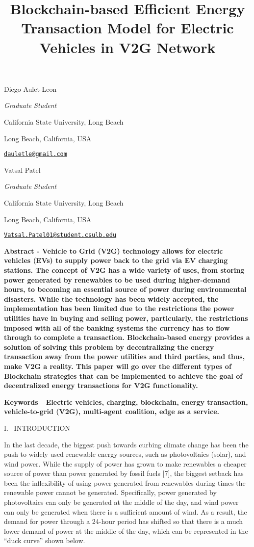 \documentclass[
]{article}
\title{\protect\hypertarget{_rock487eds43}{}{}Blockchain-based Efficient
Energy Transaction Model for Electric Vehicles in V2G Network}
\author{}
\date{}
\begin{document}
\maketitle

Diego Aulet-Leon

\emph{Graduate Student}

California State University, Long Beach

Long Beach, California, USA

\href{mailto:dauletle@gmail.com}{\nolinkurl{dauletle@gmail.com}}

Vatsal Patel

\emph{Graduate Student}

California State University, Long Beach

Long Beach, California, USA

\href{mailto:Vatsal.Patel01@student.csulb.edu}{\nolinkurl{Vatsal.Patel01@student.csulb.edu}}

\textbf{Abstract - Vehicle to Grid (V2G) technology allows for electric
vehicles (EVs) to supply power back to the grid via EV charging
stations. The concept of V2G has a wide variety of uses, from storing
power generated by renewables to be used during higher-demand hours, to
becoming an essential source of power during environmental disasters.
While the technology has been widely accepted, the implementation has
been limited due to the restrictions the power utilities have in buying
and selling power, particularly, the restrictions imposed with all of
the banking systems the currency has to flow through to complete a
transaction. Blockchain-based energy provides a solution of solving this
problem by decentralizing the energy transaction away from the power
utilities and third parties, and thus, make V2G a reality. This paper
will go over the different types of Blockchain strategies that can be
implemented to achieve the goal of decentralized energy transactions for
V2G functionality.}

\textbf{Keywords---Electric vehicles, charging, blockchain, energy
transaction, vehicle-to-grid (V2G), multi-agent coalition, edge as a
service.}

I.~ INTRODUCTION

In the last decade, the biggest push towards curbing climate change has
been the push to widely used renewable energy sources, such as
photovoltaics (solar), and wind power. While the supply of power has
grown to make renewables a cheaper source of power than power generated
by fossil fuels {[}7{]}, the biggest setback has been the inflexibility
of using power generated from renewables during times the renewable
power cannot be generated. Specifically, power generated by
photovoltaics can only be generated at the middle of the day, and wind
power can only be generated when there is a sufficient amount of wind.
As a result, the demand for power through a 24-hour period has shifted
so that there is a much lower demand of power at the middle of the day,
which can be represented in the ``duck curve'' shown below.
\end{document}
